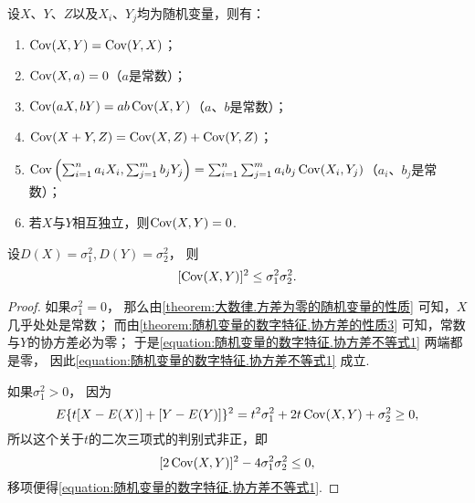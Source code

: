 \begin{property}\label{theorem:随机变量的数字特征.协方差的性质3}
设\(X\)、\(Y\)、\(Z\)以及\(X_i\)、\(Y_j\)均为随机变量，则有：
\begin{enumerate}
    \item \(\operatorname{Cov}(X,Y)=\operatorname{Cov}(Y,X)\)；
    \item \(\operatorname{Cov}(X,a)=0\)（\(a\)是常数）；
    \item \(\operatorname{Cov}(aX,bY)=ab\operatorname{Cov}(X,Y)\)（\(a\)、\(b\)是常数）；
    \item \(\operatorname{Cov}(X+Y,Z)=\operatorname{Cov}(X,Z)+\operatorname{Cov}(Y,Z)\)；
    \item \(\operatorname{Cov}\left(\sum_{i=1}^n{a_i X_i},\sum_{j=1}^m{b_j Y_j}\right)
    = \sum_{i=1}^n \sum_{j=1}^m {a_i b_j \operatorname{Cov}(X_i,Y_j)}\)（\(a_i\)、\(b_j\)是常数）；
    \item 若\(X\)与\(Y\)相互独立，则\(\operatorname{Cov}(X,Y)=0\).
\end{enumerate}
\end{property}

\begin{theorem}
设\(D(X) = \sigma_1^2,
D(Y) = \sigma_2^2\)，
则\begin{equation}\label{equation:随机变量的数字特征.协方差不等式1}
    [\operatorname{Cov}(X,Y)]^2 \leq \sigma_1^2 \sigma_2^2.
\end{equation}
\begin{proof}
如果\(\sigma_1^2=0\)，
那么由\cref{theorem:大数律.方差为零的随机变量的性质} 可知，\(X\)几乎处处是常数；
而由\cref{theorem:随机变量的数字特征.协方差的性质3} 可知，常数与\(Y\)的协方差必为零；
于是\cref{equation:随机变量的数字特征.协方差不等式1} 两端都是零，
因此\cref{equation:随机变量的数字特征.协方差不等式1} 成立.

如果\(\sigma_1^2>0\)，
因为\[
	E\{t[X-E(X)]+[Y-E(Y)]\}^2
	= t^2 \sigma_1^2
	+ 2t \operatorname{Cov}(X,Y)
	+ \sigma_2^2
	\geq 0,
\]
所以这个关于\(t\)的二次三项式的判别式非正，即\[
	[2\operatorname{Cov}(X,Y)]^2 - 4 \sigma_1^2 \sigma_2^2 \leq 0,
\]
移项便得\cref{equation:随机变量的数字特征.协方差不等式1}.
\end{proof}
\end{theorem}

